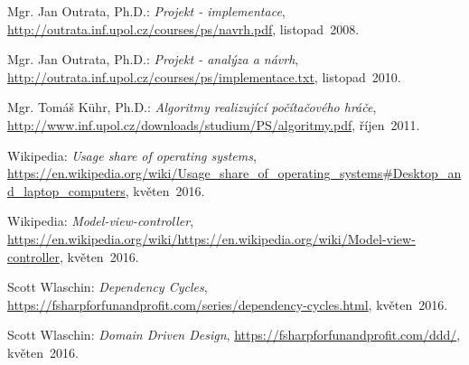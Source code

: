 \documentclass[12pt]{article}
\begin{document}
\newpage
\begin{thebibliography}{10}
	
 Mgr. Jan Outrata, Ph.D.: \emph{Projekt - implementace},
 \url{http://outrata.inf.upol.cz/courses/ps/navrh.pdf},
			listopad~2008.

	
 Mgr. Jan Outrata, Ph.D.: \emph{Projekt - analýza a návrh},
 \url{http://outrata.inf.upol.cz/courses/ps/implementace.txt},
			listopad~2010.

 Mgr. Tomáš Kühr, Ph.D.: \emph{Algoritmy realizující počítačového hráče},
 \url{http://www.inf.upol.cz/downloads/studium/PS/algoritmy.pdf},
			říjen~2011.

Wikipedia: \emph{Usage share of operating systems},
 \url{https://en.wikipedia.org/wiki/Usage_share_of_operating_systems#Desktop_and_laptop_computers},
			květen~2016.

Wikipedia: \emph{Model-view-controller},
 \url{https://en.wikipedia.org/wiki/https://en.wikipedia.org/wiki/Model-view-controller},
			květen~2016.


Scott Wlaschin: \emph{Dependency Cycles},
 \url{https://fsharpforfunandprofit.com/series/dependency-cycles.html},
			květen~2016.

Scott Wlaschin: \emph{Domain Driven Design},
 \url{https://fsharpforfunandprofit.com/ddd/},
			květen~2016.

\end{thebibliography} 
\end{document}

